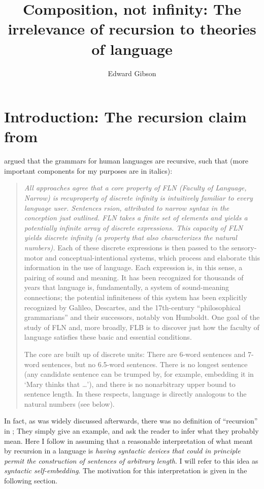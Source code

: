 \documentclass[output=paper]{langscibook}
\title[Composition, not infinity]{Composition, not infinity: The irrelevance of recursion to theories of language}
\author{Edward Gibson\affiliation{Department of Brain and Cognitive Sciences, MIT}}
\begin{document}
\maketitle
\label{chap-2_gibson}


\section{Introduction: The recursion claim from \citet{hauser2002faculty}}

\citet{hauser2002faculty} argued that the grammars for human languages are recursive, such that (more important components for my purposes are in italics):

\begin{quote}
\textit{All approaches agree that a core property of FLN (Faculty of Language, Narrow) is recuproperty of discrete infinity is intuitively familiar to every language user. Sentences rsion, attributed to narrow syntax in the conception just outlined. FLN takes a finite set of elements and yields a potentially infinite array of discrete expressions. This capacity of FLN yields discrete infinity (a property that also characterizes the natural numbers).} Each of these discrete expressions is then passed to the sensory-motor and conceptual-intentional systems, which process and elaborate this information in the use of language. Each expression is, in this sense, a pairing of sound and meaning. It has been recognized for thousands of years that language is, fundamentally, a system of sound-meaning connections; the potential infiniteness of this system has been explicitly recognized by Galileo, Descartes, and the 17th-century ``philosophical grammarians'' and their successors, notably von Humboldt. One goal of the study of FLN and, more broadly, FLB is to discover just how the faculty of language satisfies these basic and essential conditions.

\textit{}{The core are built up of discrete units:  There are 6-word sentences and 7-word sentences, but no 6.5-word sentences.  There is no longest sentence (any candidate sentence can be trumped by, for example, embedding it in `Mary thinks that  \ldots '), and there is no nonarbitrary upper bound to sentence length.  In these respects, language is directly analogous to the natural numbers (see below). } \citep[1571]{hauser2002faculty}
\end{quote}

In fact, as was widely discussed afterwards, there was no definition of ``recursion'' in \citet{hauser2002faculty};  They simply give an example, and ask the reader to infer what they probably mean.  
Here I follow \citet{pullum2020theorizing}  in assuming that a reasonable interpretation of what  \citet{hauser2002faculty} meant by recursion in a language is \textit{having syntactic devices that could in principle permit the construction of sentences of arbitrary length}.  I will refer to  this idea as \textit{syntactic self-embedding}.  The motivation for this interpretation is given in the following section.
\end{document}
